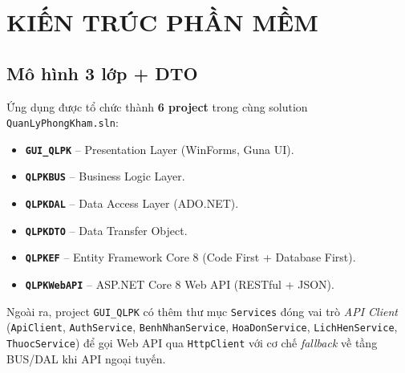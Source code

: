 \documentclass[12pt,a4paper]{report}
\begin{document}
\chapter{KIẾN TRÚC PHẦN MỀM}

\section{Mô hình 3 lớp + DTO}

Ứng dụng được tổ chức thành \textbf{6 project} trong cùng solution \texttt{QuanLyPhongKham.sln}:

\begin{itemize}[leftmargin=*]
\item \textbf{\texttt{GUI\_QLPK}} -- Presentation Layer (WinForms, Guna UI).
\item \textbf{\texttt{QLPKBUS}} -- Business Logic Layer.
\item \textbf{\texttt{QLPKDAL}} -- Data Access Layer (ADO.NET).
\item \textbf{\texttt{QLPKDTO}} -- Data Transfer Object.
\item \textbf{\texttt{QLPKEF}} -- Entity Framework Core 8 (Code First + Database First).
\item \textbf{\texttt{QLPKWebAPI}} -- ASP.NET Core 8 Web API (RESTful + JSON).
\end{itemize}

Ngoài ra, project \texttt{GUI\_QLPK} có thêm thư mục \texttt{Services} đóng vai trò \emph{API Client} (\texttt{ApiClient}, \texttt{AuthService}, \texttt{BenhNhanService}, \texttt{HoaDonService}, \texttt{LichHenService}, \texttt{ThuocService}) để gọi Web API qua \texttt{HttpClient} với cơ chế \emph{fallback} về tầng BUS/DAL khi API ngoại tuyến.
\end{document}
